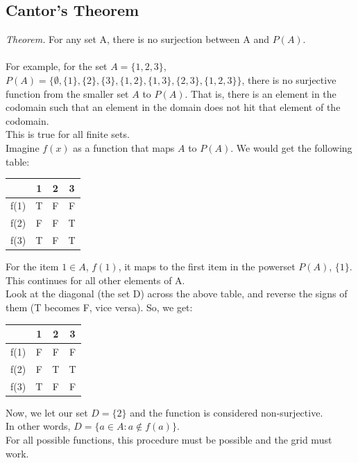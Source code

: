 \documentclass{article}
\begin{document}
\subsection{Cantor's Theorem}
\textit{Theorem.} For any set A, there is no surjection between A and $P(A)$.\\
\\
For example, for the set $A = \{1, 2, 3\}$, $P(A) = \{\emptyset, \{1\}, \{2\}, \{3\}, \{1, 2\}, \{1,3\}, \{2, 3\}, \{1,2,3\}\}$, there is no surjective function from the smaller set $A$ to $P(A)$. That is, there is an element in the codomain such that an element in the domain does not hit that element of the codomain.\\
This is true for all finite sets.\\
Imagine $f(x)$ as a function that maps $A$ to $P(A)$. We would get the following table:
\begin{center}
    \begin{tabular}{c|c|c|c}
              & 1 & 2  & 3 \\
\hline
         f(1) & T & F & F\\
         f(2) & F & F & T\\
         f(3) & T & F & T
    \end{tabular}
\end{center}
For the item $1 \in A$, $f(1)$, it maps to the first item in the powerset $P(A)$, $\{1\}$. This continues for all other elements of A.\\
Look at the diagonal (the set D) across the above table, and reverse the signs of them (T becomes F, vice versa). So, we get:
\begin{center}
    \begin{tabular}{c|c|c|c}
              & 1 & 2  & 3 \\
\hline
         f(1) & F & F & F\\
         f(2) & F & T & T\\
         f(3) & T & F & F
    \end{tabular}
\end{center}
Now, we let our set $D = \{2\}$ and the function is considered non-surjective.\\
In other words, $D = \{a \in A: a \not\in f(a)\}$.\\For all possible functions, this procedure must be possible and the grid must work.\\
\\
\end{document}
